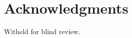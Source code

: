 \documentclass{sigchi}
\begin{document}
\section{Acknowledgments}
Witheld for blind review.


%
%
%
%




\end{document}
